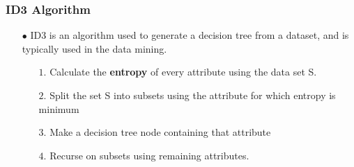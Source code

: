 \documentclass[xcolor=table]{beamer}
\begin{document}
\begin{frame}
\frametitle{ID3 Algorithm}
\begin{itemize} \itemsep16pt \parskip0pt 
  \item[$\bullet$] ID3 is an algorithm used to generate a decision tree from a dataset, and is typically used in the data mining.
  \begin{itemize} \itemsep10pt \parskip0pt 
    \item[$1.$] Calculate the {\bf entropy} of every attribute using the data set S.
    \item[$2.$] Split the set S into subsets using the attribute for which entropy is minimum 
    \item[$3.$] Make a decision tree node containing that attribute
    \item[$4.$] Recurse on subsets using remaining attributes.
  \end{itemize}
\end{itemize}

\end{frame}
\end{document}
